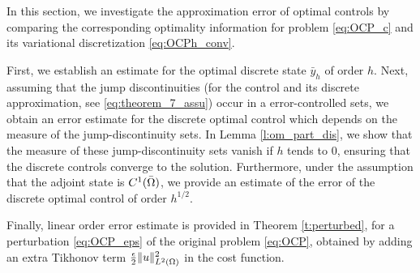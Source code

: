 In this section, we investigate the approximation error of optimal controls by comparing the corresponding optimality information for problem \eqref{eq:OCP_c} and its variational discretization \eqref{eq:OCPh_conv}. 
 
 
 First, we establish an estimate for the optimal discrete state $\bar y_h$ of order $h$. Next, assuming that the jump discontinuities (for the control and its discrete approximation, see \eqref{eq:theorem_7_assu}) occur in a error-controlled sets, we obtain an error estimate for the discrete optimal control which depends on the measure of the jump-discontinuity sets. In Lemma \ref{l:om_part_dis}, we show that the measure of these jump-discontinuity sets vanish if $h$ tends to 0, ensuring that the discrete controls converge to the solution. Furthermore, under the assumption that the adjoint state is $C^1(\bar {\Omega})$, we provide an estimate of the error of the discrete optimal control of order $h^{1/2}$.
 
 Finally, linear order error estimate is provided in Theorem \ref{t:perturbed}, for a perturbation \eqref{eq:OCP_eps} of the original problem \eqref{eq:OCP}, obtained by adding an extra Tikhonov term $\frac{\epsilon}{2} \| u \|^2_{L^2(\Omega)}$ in the cost function.
 
  


